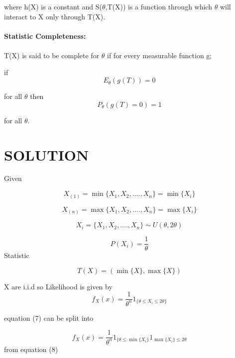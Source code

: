 \documentclass[journal,12pt,twocolumn]{IEEEtran}
\begin{document}
where h(X) is a constant and S($\theta$,T(X)) is a function through which $\theta$ will interact to X only through T(X).\\ \\

\textbf{Statistic Completeness:}\\ \\
T(X) is said to be complete for $\theta$ if for every measurable function g;

if 
\begin{equation}
        {E_\theta}(g(T))=0 
\end{equation}

for all $\theta$ then
\begin{equation}
        P_\theta(g(T)=0)=1 
\end{equation}

for all $\theta$.\\
\section{\textbf{SOLUTION}}
Given

\begin{equation}
        X_{(1)} =\min\{X_1,X_2,....,X_n\}=\min\{X_i\}
\end{equation}

\begin{equation}
        X_{(n)}=\max\{X_1,X_2,....,X_n\}=\max\{X_i\}
\end{equation}

\begin{equation}
        X_i=\{X_1,X_2,....,X_n\}\sim U(\theta,2\theta)
\end{equation}

\begin{equation}
        P(X_i)=\dfrac{1}{\theta}
\end{equation}
Statistic

\begin{equation}
        T(X)=(\min\{X\},\max\{X\})
\end{equation}

X are i.i.d so Likelihood is given by 
\begin{equation}
        f_X(x)=\frac{1}{\theta^n}1_{\{\theta\leq X_i \leq2\theta\}}
\end{equation}

equation (7) can be split into

\begin{equation}
        f_X(x)=\frac{1}{\theta^n}1_{\{\theta\leq \min\{X_i\}}1_{\max\{ X_i\}\leq2\theta}
\end{equation}
from equation (8) 
\end{document}
